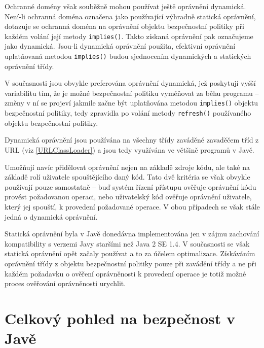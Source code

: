 Ochranné domény však souběžně mohou používat ještě oprávnění dynamická. Není-li ochranná doména označena jako používající výhradně statická oprávnění,
dotazuje se ochranná doména na oprávnění objektu bezpečnostní politiky při každém volání její metody {\tt implies()}.
Takto získaná oprávnění pak označujeme jako dynamická. \cite{sourceProtectionDomain}
Jsou-li dynamická oprávnění použita, efektivní oprávnění uplatňovaná metodou {\tt implies()} budou sjednocením dynamických a statických oprávnění třídy.
\cite{sourceProtectionDomain}

V současnosti jsou obvykle preferována oprávnění dynamická, jež poskytují vyšší variabilitu tím, že je možné bezpečnostní politiku vyměňovat za běhu
programu -- změny v ní se projeví jakmile začne být uplatňována metodou {\tt implies()} objektu bezpečnostní politiky, tedy zpravidla po volání metody
{\tt refresh()} používaného objektu bezpečnostní politiky.

Dynamická oprávnění jsou používána na všechny třídy zaváděné zavaděčem tříd z URL (viz \ref{URLClassLoader}) a jsou tedy využívána ve většině programů v Javě.
\cite{sourceURLClassLoader}

Umožňují navíc přidělovat oprávnění nejen na základě zdroje kódu, ale také na základě rolí uživatele spouštějícího daný kód. Tato dvě kritéria se však
obvykle používají pouze samostatně -- buď systém řízení přístupu ověřuje oprávnění kódu provést požadovanou operaci, nebo uživatelský kód ověřuje oprávnění
uživatele, který jej spouští, k provedení požadované operace. V obou případech se však stále jedná o dynamická oprávnění.

Statická oprávnění byla v Javě donedávna implementována jen v zájmu zachování kompatibility s verzemi Javy staršími než Java 2 SE 1.4. \cite{sourceProtectionDomain}
V současnosti se však statická oprávnění opět začaly používat a to za účelem optimalizace.
Získáváním oprávnění třídy z objektu bezpečnostní politiky pouze při zavádění třídy a ne při každém požadavku o ověření oprávněnosti k provedení operace je totiž možné proces ověřování oprávněnosti urychlit.

\section{Celkový pohled na bezpečnost v Javě} \label{celkovyPohled}


